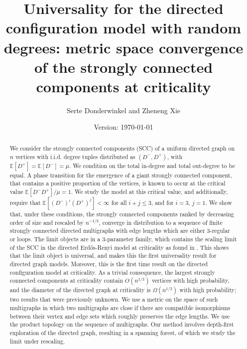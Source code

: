 \documentclass[notitlepage,11pt, a4paper]{article}
\title{Universality for the directed configuration model with random degrees: metric space convergence of the strongly connected components at criticality}
\author{Serte Donderwinkel and Zheneng Xie}
\date{Version: \today}
\def \E {{\mathbb E}}
\begin{document}
\maketitle
\begin{abstract}
  We consider the strongly connected components (SCC) of a uniform directed graph on $n$ vertices with i.i.d. degree tuples distributed as $(D^-,D^+)$, with $\E[D^+]=\E[D^-]=\mu$. We condition on the total in-degree and total out-degree to be equal. A phase transition for the emergence of a giant strongly connected component, that contains a positive proportion of the vertices, is known to occur at the critical value $\E[D^-D^+]/\mu=1$. We study the model at this critical value, and additionally, require that $\E[(D^-)^i(D^+)^j]<\infty$ for all $i+j\leq 3$, and for $i=3$, $j=1$. We show that, under these conditions, the strongly connected components ranked by decreasing order of size and rescaled by $n^{-1/3}$, converge in distribution to a sequence of finite strongly connected directed multigraphs with edge lengths which are either $3$-regular or loops. The limit objects are in a $3$-parameter family, which contains the scaling limit of the SCC in the directed Erd\H{o}s-Renyi model at criticality as found in \cite{goldschmidtScalingLimitCritical2019}. This shows that the limit object is universal, and makes this the first universality result for directed graph models. Moreover, this is the first time result on the directed configuration model at criticality. As a trivial consequence, the largest strongly connected components at criticality contain $O(n^{1/3})$ vertices with high probability, and the diameter of the directed graph at criticality is $\Omega(n^{1/3})$ with high probability; two results that were previously unknown.  We use a metric on the space of such multigraphs in which two multigraphs are close if there are compatible isomorphisms between their vertex and edge sets which roughly preserves the edge lengths. We use the product topology on the sequence of multigraphs. Our method involves depth-first exploration of the directed graph, resulting in a spanning forest, of which we study the limit under rescaling.
\end{abstract}






\appendix





\end{document}
